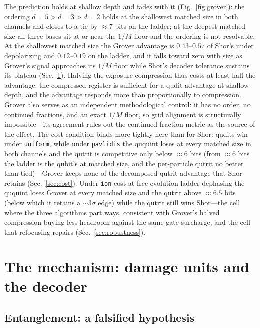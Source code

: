 \documentclass[aps,pra,reprint,superscriptaddress,nofootinbib,floatfix]{revtex4-2}
\begin{document}
The prediction holds at shallow depth and fades with it
(Fig.~\ref{fig:grover}): the ordering $d=5>d=3>d=2$ holds at the
shallowest matched size in both channels and closes to a tie by
${\approx}7$ bits on the ladder; at the deepest matched size all
three bases sit at or near the $1/M$ floor and the ordering is not
resolvable. At the shallowest matched size the Grover advantage is
$0.43$--$0.57$ of Shor's under depolarizing and $0.12$--$0.19$ on
the ladder, and it falls toward zero with size as Grover's signal
approaches its $1/M$ floor while Shor's decoder tolerance sustains
its plateau (Sec.~\ref{sec:mechanism}). Halving the exposure
compression thus costs at least half the advantage: the
compressed register is sufficient for a qudit advantage at shallow
depth, and the advantage responds more than proportionally to
compression. Grover also
serves as an independent methodological control: it has no order, no
continued fractions, and an exact $1/M$ floor, so grid alignment is
structurally impossible---its agreement rules out the
continued-fraction metric as the source of the effect. The cost
condition binds more tightly here than for Shor: qudits win under
\texttt{uniform}, while under \texttt{pavlidis} the ququint loses at
every matched size in both channels and the qutrit is competitive
only below ${\approx}6$ bits (from ${\approx}6$ bits the ladder is
the qubit's at matched size, and the per-particle qutrit no better
than tied)---Grover keeps none of the decomposed-qutrit advantage
that Shor retains (Sec.~\ref{sec:cost}). Under \texttt{ion} cost at
free-evolution ladder dephasing the
ququint loses Grover at every matched size and the qutrit above
${\approx}6.5$ bits (below which it retains a ${\sim}3\sigma$ edge)
while the qutrit still wins Shor---the cell
where the three algorithms part ways, consistent with Grover's halved
compression buying less headroom against the same gate surcharge, and
the cell that refocusing repairs (Sec.~\ref{sec:robustness}).

\section{The mechanism: damage units and the decoder}
\label{sec:mechanism}

\subsection{Entanglement: a falsified hypothesis}
\end{document}
